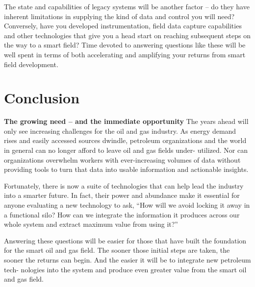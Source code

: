 \documentclass[twocolumn]{article}
\begin{document}
The state and capabilities of legacy systems will be another factor – do they have inherent limitations in supplying the kind of data and control you will need? Conversely, have you developed instrumentation, field data capture capabilities and other technologies that give you a head start on reaching subsequent steps on the way to a smart field? Time devoted to answering questions like these will be well spent in terms of both accelerating and amplifying your returns from smart field development.


\section{Conclusion}
\noindent
\textbf{The growing need – and the immediate opportunity}
The years ahead will only see increasing challenges for the
oil and gas industry. As energy demand rises and easily accessed sources dwindle, petroleum organizations and the world in general can no longer afford to leave oil and gas fields under- utilized. Nor can organizations overwhelm workers with ever-increasing volumes of data without providing tools to turn that data into usable information and actionable insights.

Fortunately, there is now a suite of technologies that can
help lead the industry into a smarter future. In fact, their power and abundance make it essential for anyone evaluating a new technology to ask, “How will we avoid locking it away in a functional silo? How can we integrate the information it produces across our whole system and extract maximum value from using it?”

Answering these questions will be easier for those that have built the foundation for the smart oil and gas field. The sooner those initial steps are taken, the sooner the returns can begin. And the easier it will be to integrate new petroleum tech- nologies into the system and produce even greater value from the smart oil and gas field.









    
    
\end{document}
